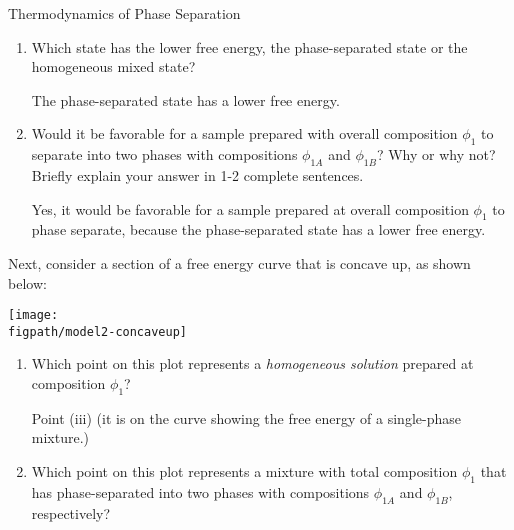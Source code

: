 \begin{activity}{Thermodynamics of Phase Separation}
\begin{ctqs}
\begin{enumerate}
				\item Which state has the lower free energy, the phase-separated state or the homogeneous mixed state?
					
					\begin{solution}[0.75in]{}
					
						The phase-separated state has a lower free energy.
					
					\end{solution}
					
				\item Would it be favorable for a sample prepared with overall composition $\phi_1$ to separate into two phases with compositions $\phi_{1A}$ and $\phi_{1B}$?  Why or why not?  Briefly explain your answer in 1-2 complete sentences.
					
					\begin{solution}[1.25in]{}
					
						Yes, it would be favorable for a sample prepared at overall composition $\phi_1$ to phase separate, because the phase-separated state has a lower free energy.
					
					\end{solution}
					
			\end{enumerate}
			
		\clearpage
		\question Next, consider a section of a free energy curve that is concave up, as shown below:
	
		\vspace{0.1in}
		\centerline{\texttt{[image: \\figpath/model2-concaveup]}}

			\begin{enumerate}
				\item Which point on this plot represents a \emph{homogeneous solution} prepared at composition $\phi_1$?
					
					\begin{solution}[0.75in]{}
					
						Point (iii) (it is on the curve showing the free energy of a single-phase mixture.)
						
					\end{solution}
					
				\item Which point on this plot represents a mixture with total composition $\phi_1$ that has phase-separated into two phases with compositions $\phi_{1A}$ and $\phi_{1B}$, respectively?
					

\end{enumerate}
\end{ctqs}
\end{activity}
